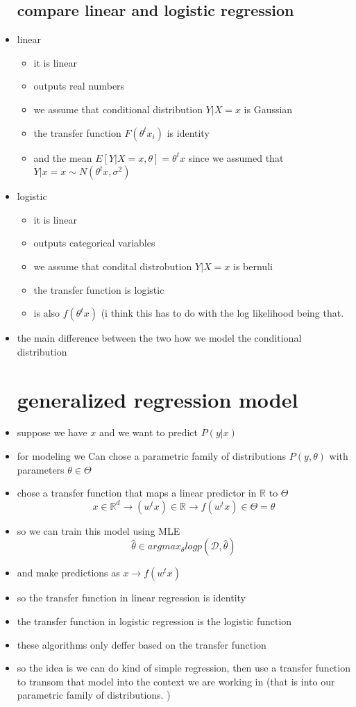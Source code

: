 \documentclass{article}
\begin{document}
\begin{itemize}
\subsection{compare linear and logistic regression}
\item linear
\begin{itemize}
    \item it is linear 
    \item outputs real numbers
    \item we assume that conditional distribution $Y|X=x$ is Gaussian
    \item the transfer function $F(\theta^tx_i)$ is identity 
    \item and the mean $E[Y|X=x,\theta]=\theta^tx$ since we assumed that $Y|x=x\sim N(\theta^tx, \sigma^2)$
\end{itemize}
\item logistic
\begin{itemize}
    \item it is linear 
    \item outputs categorical variables
    \item we assume that condital distrobution $Y|X=x$ is bernuli 
    \item the transfer function  is logistic 
    \item is also $f(\theta^t x)$ (i think this has to do with the log likelihood being that. 
\end{itemize}
\item the main difference between the two how we model the conditional distribution
\section{generalized regression model}
\item suppose we have $x$ and we want to predict $P(y|x)$
\item for modeling we Can chose a parametric family of distributions $P(y,\theta)$ with parameters $\theta\in \Theta$
\item chose a transfer function that maps a linear predictor in $\mathbb{R}$ to $\Theta$ $$x\in \mathbb{R}^d\rightarrow (w^tx)\in \mathbb{R}\rightarrow f(w^tx)\in \Theta =\theta$$
\item so we can train this model using MLE $$\hat{\theta}\in argmax_{\theta}logp(\mathcal{D},\hat{\theta})$$ 
\item and make predictions as $x\rightarrow f(w^tx)$
\item so the transfer function in linear regression is identity
\item the transfer function in logistic regression is the logistic function
\item these algorithms only deffer based on the transfer function 
\item so the idea is we can do kind of simple regression, then use a transfer function to transom that model into the context we are working in (that is into our parametric family of distributions. ) 

\end{itemize}
\end{document}
